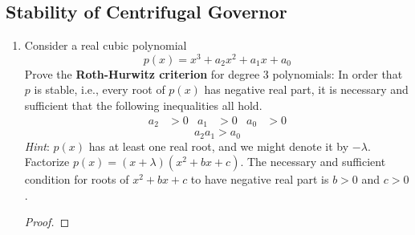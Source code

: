 \documentclass[../psets.tex]{subfiles}
\begin{document}
\subsection*{Stability of Centrifugal Governor}
\begin{enumerate}
    \item Consider a real cubic polynomial
    \begin{equation*}
        p(x) = x^3+a_2x^2+a_1x+a_0
    \end{equation*}
    Prove the \textbf{Roth-Hurwitz criterion} for degree 3 polynomials: In order that $p$ is stable, i.e., every root of $p(x)$ has negative real part, it is necessary and sufficient that the following inequalities all hold.
    \begin{align*}
        a_2 &> 0&
        a_1 &> 0&
        a_0 &> 0
    \end{align*}
    \begin{equation*}
        a_2a_1 > a_0
    \end{equation*}
    \emph{Hint}: $p(x)$ has at least one real root, and we might denote it by $-\lambda$. Factorize $p(x)=(x+\lambda)(x^2+bx+c)$. The necessary and sufficient condition for roots of $x^2+bx+c$ to have negative real part is $b>0$ and $c>0$.
    \begin{proof}



\end{proof}
\end{enumerate}
\end{document}
